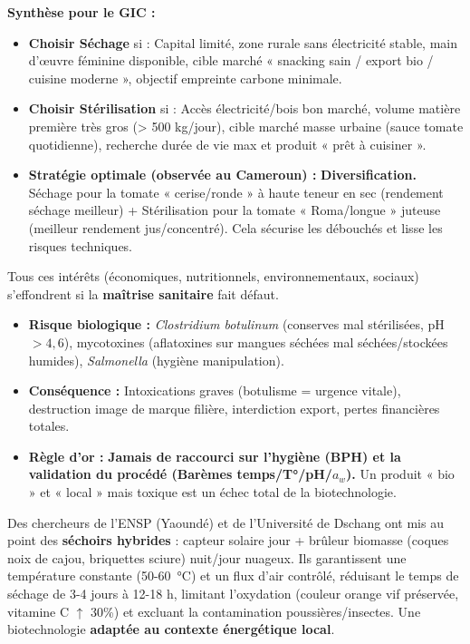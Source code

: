 \documentclass[11pt]{article}
\begin{document}
\begin{exoresolu}
\textbf{Synthèse pour le GIC :}
\begin{itemize}
    \item \textbf{Choisir Séchage} si : Capital limité, zone rurale sans électricité stable, main d'œuvre féminine disponible, cible marché « snacking sain / export bio / cuisine moderne », objectif empreinte carbone minimale.
    \item \textbf{Choisir Stérilisation} si : Accès électricité/bois bon marché, volume matière première très gros (> 500 kg/jour), cible marché masse urbaine (sauce tomate quotidienne), recherche durée de vie max et produit « prêt à cuisiner ».
    \item \textbf{Stratégie optimale (observée au Cameroun) :} \textbf{Diversification.} Séchage pour la tomate « cerise/ronde » à haute teneur en sec (rendement séchage meilleur) + Stérilisation pour la tomate « Roma/longue » juteuse (meilleur rendement jus/concentré). Cela sécurise les débouchés et lisse les risques techniques.
\end{itemize}
\end{exoresolu}

\begin{attention}
Tous ces intérêts (économiques, nutritionnels, environnementaux, sociaux) s'effondrent si la \textbf{maîtrise sanitaire} fait défaut.
\begin{itemize}
    \item \textbf{Risque biologique :} \textit{Clostridium botulinum} (conserves mal stérilisées, pH $> 4,6$), mycotoxines (aflatoxines sur mangues séchées mal séchées/stockées humides), \textit{Salmonella} (hygiène manipulation).
    \item \textbf{Conséquence :} Intoxications graves (botulisme = urgence vitale), destruction image de marque filière, interdiction export, pertes financières totales.
    \item \textbf{Règle d'or :} \textbf{Jamais de raccourci sur l'hygiène (BPH) et la validation du procédé (Barèmes temps/T°/pH/$a_w$).} Un produit « bio » et « local » mais toxique est un échec total de la biotechnologie.
\end{itemize}
\end{attention}

\begin{savaistu}
Des chercheurs de l'ENSP (Yaoundé) et de l'Université de Dschang ont mis au point des \textbf{séchoirs hybrides} : capteur solaire jour + brûleur biomasse (coques noix de cajou, briquettes sciure) nuit/jour nuageux. Ils garantissent une température constante (50-\SI{60}{\celsius}) et un flux d'air contrôlé, réduisant le temps de séchage de 3-4 jours à 12-18 h, limitant l'oxydation (couleur orange vif préservée, vitamine C $\uparrow$ 30\%) et excluant la contamination poussières/insectes. Une biotechnologie \textbf{adaptée au contexte énergétique local}.
\end{savaistu}
\end{document}
